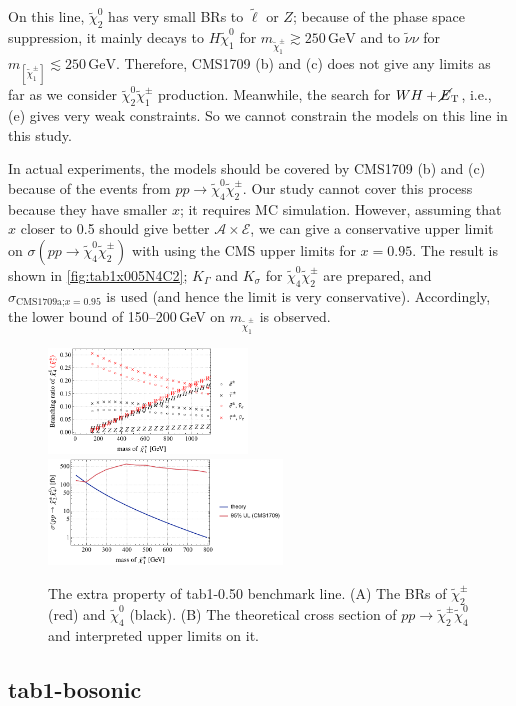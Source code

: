 \documentclass[a4paper,10pt,captions=tableheading,DIV=14]{scrartcl}
\numberwithin{equation}{section}
\newcommand\w[1]{_{\mathrm{#1}}}
\newcommand\unit[1]{\,\mathrm{#1}\xspace}
\newcommand\GeV{\unit{GeV}}
\newcommand\neut  [1][\relax]{{\tilde\chi^0_{#1}}}
\newcommand\charPM[1][\relax]{{\tilde\chi^\pm_{#1}}}
\newcommand\mET{\cancel{E}\w T}
\begin{document}
On this line, $\neut[2]$ has very small BRs to $\tilde\ell$ or $Z$; because of the phase space suppression, it mainly decays to $H\neut[1]$ for $m_{\charPM[1]}\gtrsim250\GeV$ and to $\tilde\nu\nu$ for $m_[\charPM[1]]\lesssim250\GeV$.
Therefore, CMS1709 (b) and (c) does not give any limits as far as we consider $\neut[2]\charPM[1]$ production.
Meanwhile, the search for $WH+\mET$, i.e., (e) gives very weak constraints.
So we cannot constrain the models on this line in this study.

In actual experiments, the models should be covered by CMS1709 (b) and (c) because of the events from $pp\to\neut[4]\charPM[2]$.
Our study cannot cover this process because they have smaller $x$; it requires MC simulation.
However, assuming that $x$ closer to 0.5 should give better $\mathcal A\times\mathcal E$, we can give a conservative upper limit on $\sigma(pp\to\neut[4]\charPM[2])$ with using the CMS upper limits for $x=0.95$.
The result is shown in \cref{fig:tab1x005N4C2}; $K_\Gamma$ and $K_\sigma$ for $\neut[4]\charPM[2]$ are prepared, and $\sigma_{\text{CMS1709a;$x=0.95$}}$ is used (and hence the limit is very conservative).
Accordingly, the lower bound  of 150--200\,GeV on $m_{\charPM[1]}$ is observed.

\begin{figure}[b]
  \centering
  \includegraphics[height=80pt]{../plots/plot_tab1x095_br42.pdf}
  \includegraphics[height=80pt]{../plots/plot_tab1x095_limit42.pdf}

  \caption{\label{fig:tab1x095N4C2}The extra property of tab1-0.50 benchmark line.
 (A) The BRs of $\charPM[2]$ (red) and $\neut[4]$ (black).
 (B) The theoretical cross section of $pp\to\charPM[2]\neut[4]$ and interpreted upper limits on it.
}
\end{figure}

\clearpage

\subsection{tab1-bosonic}
\end{document}
